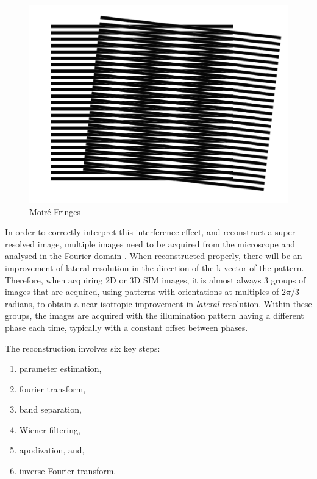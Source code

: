 \documentclass[12pt]{article}
\begin{document}
\begin{figure}[hbtp]
    \includegraphics[scale=0.5]{figures/moire.png}
    \caption{Moir\'{e} Fringes}
    \label{fig:moire}
\end{figure}

In order to correctly interpret this interference effect, and reconstruct a super-resolved image,
multiple images need to be acquired from the microscope and analysed in the Fourier domain \cite{SIM2008}.
When reconstructed properly, there will be an improvement of lateral resolution in the direction of the k-vector of the pattern.
Therefore, when acquiring 2D or 3D SIM images, it is almost always 3 groups of images that are acquired,
using patterns with orientations at multiples of $2\pi/3$ radians,
to obtain a near-isotropic improvement in \textit{lateral} resolution.
Within these groups, the images are acquired with the illumination pattern having a different phase each time,
typically with a constant offset between phases.

The reconstruction involves six key steps:

\begin{enumerate}
    \item parameter estimation,
    \item fourier transform,
    \item band separation,
    \item Wiener filtering,
    \item apodization, and,
    \item inverse Fourier transform.
\end{enumerate}
\end{document}
